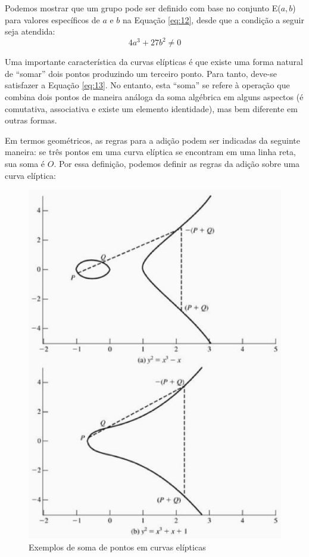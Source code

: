 Podemos mostrar que um grupo pode ser definido com base no conjunto E(\(a, b\)) para valores específicos de \(a\) e \(b\) na Equação \ref{eq:12}, desde que a condição a seguir seja atendida:
\begin{equation}
4a^3 + 27b^2 \neq 0 \label{eq:13}
\end{equation}

Uma importante característica da curvas elípticas é que existe uma forma natural de ``somar'' dois pontos produzindo um terceiro ponto. Para tanto, deve-se satisfazer a Equação \ref{eq:13}. No entanto, esta ``soma'' se refere à operação que combina dois pontos de maneira análoga da soma algébrica em alguns aspectos (é comutativa, associativa e existe um elemento identidade), mas bem diferente em outras formas.

Em termos geométricos, as regras para a adição podem ser indicadas da seguinte maneira: se três pontos em uma curva elíptica se encontram em uma linha reta, sua soma é $O$. Por essa definição, podemos definir as regras da adição sobre uma curva elíptica:

\begin{figure}[h]
\centering
\includegraphics[scale=0.5, bb=0 0 484 636]{figuras/pontos_curva.eps}
\caption{Exemplos de soma de pontos em curvas elípticas}
\label{fig:pontos}
\end{figure}

